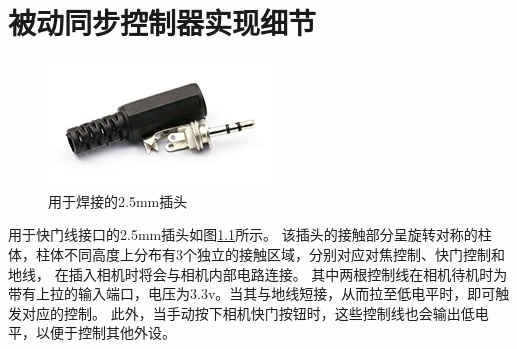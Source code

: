 \chapter{被动同步控制器实现细节}
\label{app:passive_sync}

\begin{figure}
    \centering
    \includegraphics{figures/2.5mm}
    \caption{用于焊接的2.5mm插头}
    \label{fig:2.5mm}
\end{figure}
用于快门线接口的2.5mm插头如图\ref{fig:2.5mm}所示。
该插头的接触部分呈旋转对称的柱体，柱体不同高度上分布有3个独立的接触区域，分别对应对焦控制、快门控制和地线，
在插入相机时将会与相机内部电路连接。
其中两根控制线在相机待机时为带有上拉的输入端口，电压为3.3v。当其与地线短接，从而拉至低电平时，即可触发对应的控制。
此外，当手动按下相机快门按钮时，这些控制线也会输出低电平，以便于控制其他外设。

